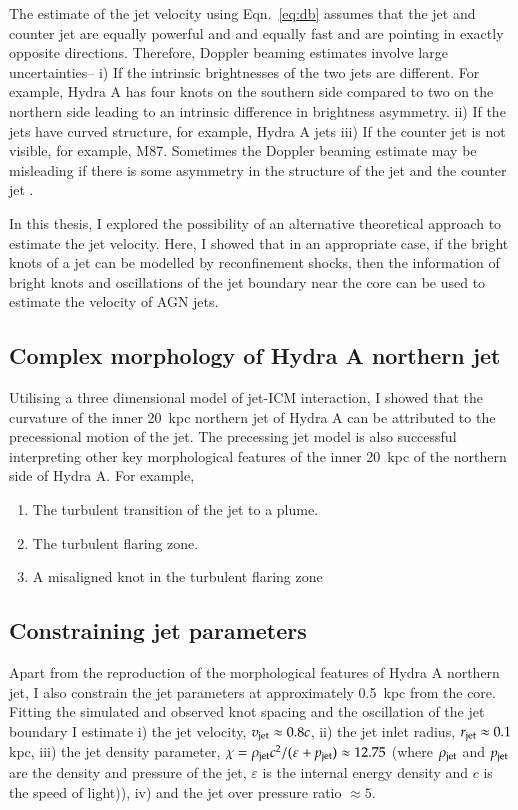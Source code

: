 The estimate of the jet velocity using Eqn.~\eqref{eq:db} assumes that the jet and counter jet are equally powerful and and equally fast and are pointing in exactly opposite directions. Therefore, Doppler beaming estimates involve large uncertainties-- i) If the intrinsic brightnesses of the two jets are different. For example, Hydra A has four knots on the southern side compared to two on the northern side leading to an intrinsic difference in brightness asymmetry. ii) If the jets have curved structure, for example, Hydra A jets iii) If the counter jet is not visible, for example, M87. Sometimes the Doppler beaming estimate may be misleading if there is some asymmetry in the structure of the jet and the counter jet \citep{kovalev07}.

In this thesis, I explored the possibility of an alternative theoretical approach to estimate the jet velocity. Here, I showed that in an appropriate case, if the bright knots of a jet can be modelled by reconfinement shocks, then the information of bright knots and oscillations of the jet boundary near the core can be used to estimate the velocity of AGN jets.

\subsection{Complex morphology of Hydra A northern jet}
Utilising a three dimensional model of jet-ICM interaction, I showed that the curvature of the inner 20~kpc northern jet of Hydra A can be attributed to the precessional motion of the jet. The precessing jet model is also successful interpreting other key morphological features of the inner 20~kpc of the northern side of Hydra A. For example, 
\begin{enumerate}
\item The turbulent transition of the jet to a plume.
\item The turbulent flaring zone. 
\item A misaligned knot in the turbulent flaring zone
\end{enumerate}

\subsection{Constraining jet parameters} Apart from the reproduction of the morphological features of Hydra A northern jet, I also constrain the jet parameters at approximately 0.5~kpc from the core. Fitting the simulated and observed knot spacing and the oscillation of the jet boundary I estimate i) the jet velocity, $v_{\rm jet} \approx 0.8c$, ii) the jet inlet radius, $r_{\rm jet} \approx 0.1$ kpc, iii) the jet density parameter, $\chi =\rho_{\rm jet} c^2/(\varepsilon+p_{\rm jet}) \approx 12.75$ (where $\rho_{\rm jet}$ and $p_{\rm jet}$ are the density and pressure of the jet, $\varepsilon$ is the internal energy density and $c$ is the speed of light)), iv) and the jet over pressure ratio $\approx 5$. 

